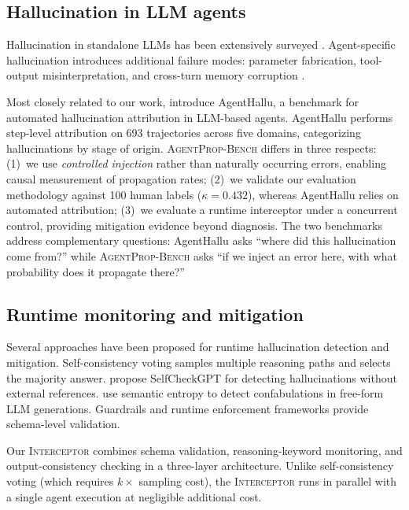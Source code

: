 \documentclass{article}
\newcommand{\bench}{\textsc{AgentProp-Bench}\xspace}
\newcommand{\interceptor}{\textsc{Interceptor}\xspace}
\begin{document}
\subsection{Hallucination in LLM agents}

Hallucination in standalone LLMs has been extensively surveyed
\citep{huang2024hallucination,lin2025agenthallusurvey}.
Agent-specific hallucination introduces additional failure modes:
parameter fabrication, tool-output misinterpretation, and cross-turn
memory corruption \citep{zhang2025memory}.

Most closely related to our work, \citep{liu2026agenthallu} introduce
AgentHallu, a benchmark for automated hallucination attribution in
LLM-based agents.
AgentHallu performs step-level attribution on 693 trajectories across
five domains, categorizing hallucinations by stage of origin.
\bench{} differs in three respects:
(1)~we use \emph{controlled injection} rather than naturally occurring
errors, enabling causal measurement of propagation rates;
(2)~we validate our evaluation methodology against 100 human labels
($\kappa{=}0.432$), whereas AgentHallu relies on automated attribution;
(3)~we evaluate a runtime interceptor under a concurrent control,
providing mitigation evidence beyond diagnosis.
The two benchmarks address complementary questions: AgentHallu asks
``where did this hallucination come from?'' while \bench{} asks
``if we inject an error here, with what probability does it propagate
there?''

\subsection{Runtime monitoring and mitigation}

Several approaches have been proposed for runtime hallucination
detection and mitigation.
Self-consistency voting \citep{wang2023selfconsistency} samples multiple
reasoning paths and selects the majority answer.
\citep{manakul2023selfcheckgpt} propose SelfCheckGPT for detecting
hallucinations without external references.
\citep{farquhar2024semantic} use semantic entropy to detect
confabulations in free-form LLM generations.
Guardrails and runtime enforcement frameworks
\citep{wang2026agentspec} provide schema-level validation.

Our \interceptor{} combines schema validation, reasoning-keyword
monitoring, and output-consistency checking in a three-layer architecture.
Unlike self-consistency voting (which requires $k\times$ sampling cost),
the \interceptor{} runs in parallel with a single agent execution at
negligible additional cost.
\end{document}
